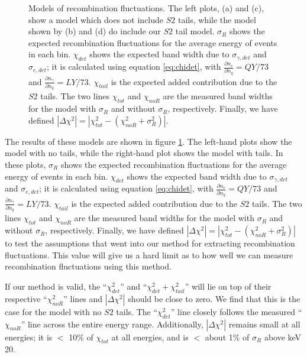 {\begin{figure}[p]
\caption{Models of recombination fluctuations. The left plots, (a) and (c), show a model which does not include $S2$ tails, while the model shown by (b) and (d) do include our $S2$ tail model. $\sigma_{R}$ shows the expected recombination fluctuations for the average energy of events in each bin. $\chi_{det}$ shows the expected band width due to $\sigma_{\gamma,det}$ and $\sigma_{e,det}$; it is calculated using equation \ref{eq:chidet}, with $\frac{\partial n_e}{\partial n_{q}}=QY/73$ and $\frac{\partial n_{\gamma}}{\partial n_{q}}=LY/73$. $\chi_{tail}$ is the expected added contribution due to the $S2$ tails. The two lines $\chi_{tot}$ and $\chi_{noR}$ are the measured band widths for the model with $\sigma_R$ and without $\sigma_R$, respectively. Finally, we have defined $|\Delta\chi^2|= | \chi_{tot}^2-(\chi_{noR}^2+\sigma_R^2)|$.}
\label{fig:toysigr}
\end{figure}
    \clearpage
}

The results of these models are shown in figure \ref{fig:toysigr}. The left-hand plots show the model with no tails, while the right-hand plot shows the model with tails. In these plots, $\sigma_{R}$ shows the expected recombination fluctuations for the average energy of events in each bin. $\chi_{det}$ shows the expected band width due to $\sigma_{\gamma,det}$ and $\sigma_{e,det}$; it is calculated using equation \ref{eq:chidet}, with $\frac{\partial n_e}{\partial n_{q}}=QY/73$ and $\frac{\partial n_{\gamma}}{\partial n_{q}}=LY/73$. $\chi_{tail}$ is the expected added contribution due to the $S2$ tails. The two lines $\chi_{tot}$ and $\chi_{noR}$ are the measured band widths for the model with $\sigma_R$ and without $\sigma_R$, respectively. Finally, we have defined $|\Delta\chi^2|= | \chi_{tot}^2-(\chi_{noR}^2+\sigma_R^2)|$ to test the assumptions that went into our method for extracting recombination fluctuations. This value will give us a hard limit as to how well we can measure recombination fluctuations using this method.

If our method is valid, the ``$\chi_{det}^2$'' and ``$\chi_{det}^2+\chi_{tail}^2$'' will lie on top of their respective ``$\chi_{noR}^2$'' lines and $|\Delta\chi^2|$ should be close to zero. We find that this is the case for the model with no $S2$ tails. The ``$\chi_{det}^2$'' line closely follows the measured ``$\chi_{noR}$'' line across the entire energy range. Additionally, $|\Delta\chi^2|$ remains small at all energies; it is $<$ 10\% of $\chi_{tot}$ at all energies, and is $<$ about 1\% of $\sigma_R$ above keV 20.

